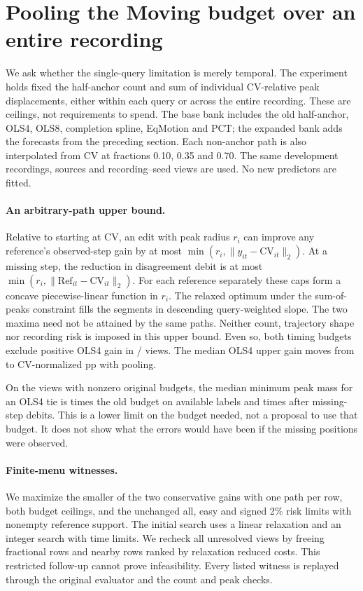 \section{Pooling the Moving budget over an entire recording}
We ask whether the single-query limitation is merely temporal.
The experiment holds fixed the half-anchor count and sum of
individual CV-relative peak displacements, either within each
query or across the entire recording. These are ceilings, not
requirements to spend. The base bank includes the old half-anchor,
OLS4, OLS8, completion spline, EqMotion and PCT; the expanded
bank adds the forecasts from the preceding section. Each non-anchor
path is also interpolated from CV at fractions 0.10, 0.35 and 0.70.
The same \RecordPeakRecords{} development recordings,
\RecordPeakSources{} sources and \RecordPeakViews{} recording--seed
views are used. No new predictors are fitted.

\paragraph{An arbitrary-path upper bound.}
Relative to starting at CV, an edit with peak radius $r_i$
can improve any reference's observed-step gain by at most
$\min(r_i,\|y_{it}-\mathrm{CV}_{it}\|_2)$. At a missing step,
the reduction in disagreement debit is at most
$\min(r_i,\|\mathrm{Ref}_{it}-\mathrm{CV}_{it}\|_2)$.
For each reference separately these caps form a concave
piecewise-linear function in $r_i$. The relaxed optimum under
the sum-of-peaks constraint fills the segments in descending
query-weighted slope. The two maxima need not be attained by
the same paths. Neither count, trajectory shape nor recording
risk is imposed in this upper bound. Even so, both timing
budgets exclude positive OLS4 gain in
\RecordPeakExcluded{}/\RecordPeakViews{} views. The median OLS4
upper gain moves from \RecordPeakQueryMedian{} to
\RecordPeakRecordMedian{} CV-normalized pp with pooling.

On the \RecordPeakPositiveBudget{} views with nonzero original
budgets, the median minimum peak mass for an OLS4 tie is
\RecordPeakKnownMultiple{} times the old budget on available labels
and \RecordPeakDebitedMultiple{} times after missing-step debits.
This is a lower limit on the budget needed, not a proposal
to use that budget. It does not show what the errors would
have been if the missing positions were observed.

\paragraph{Finite-menu witnesses.}
We maximize the smaller of the two conservative gains with one
path per row, both budget ceilings, and the unchanged all,
easy and signed 2\% risk limits with nonempty reference support.
The initial search uses a linear relaxation and an integer search
with time limits. We recheck all \RecordPeakRechecked{} unresolved
views by freeing fractional rows and nearby rows ranked by
relaxation reduced costs. This restricted follow-up cannot prove
infeasibility. Every listed witness is replayed through the original
evaluator and the count and peak checks.

